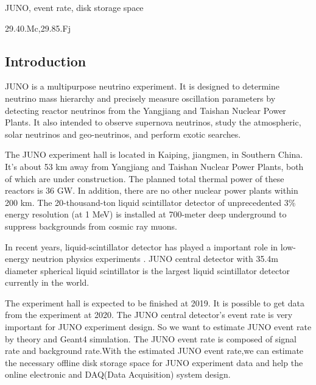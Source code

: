 \documentclass[a4paper,10pt,twoside]{paper}
\begin{document}
	\begin{keyword}
		JUNO, event rate, disk storage space
	\end{keyword}

	\begin{pacs}
		29.40.Mc,29.85.Fj
	\end{pacs}


	\begin{multicols}{2}

		\section{Introduction}
		JUNO\cite{lab1} is a multipurpose neutrino experiment. It is
		designed to determine neutrino mass hierarchy and precisely
		measure oscillation parameters by detecting reactor
		neutrinos from the Yangjiang and Taishan Nuclear Power
		Plants. It also intended to observe supernova neutrinos,
		study the atmospheric, solar neutrinos and geo-neutrinos,
		and perform exotic searches.

		The JUNO experiment hall is located in Kaiping, jiangmen,
		in Southern China. It's about 53 km away from Yangjiang
		and Taishan Nuclear Power Plants, both of which are
		under construction. The planned total thermal power of
		these reactors is 36 GW. In addition, there are no other
		nuclear power plants within 200 km.  The  20-thousand-ton
		liquid scintillator detector of unprecedented 3\% energy
		resolution (at 1 MeV) is installed at 700-meter deep
		underground to suppress backgrounds from cosmic ray muons. 

		In recent years, liquid-scintillator detector has played a important role in low-energy
		neutrion physics experiments \cite{lab2, lab3, lab4, lab5, lab6, lab7}.
		JUNO central detector with 35.4m diameter spherical liquid scintillator is the largest
		liquid scintillator detector currently in the world. 

		The experiment hall is expected to be finished at 2019. 
		It is possible to get data from the experiment at 2020.
		The JUNO central detector's event rate is very important for 
		JUNO experiment design. So we want to estimate JUNO
		event rate by theory and Geant4 simulation. The
		JUNO event rate is composed of signal rate and background
		rate.With the estimated JUNO event rate,we can estimate the necessary
		offline disk storage space for JUNO experiment data and help the 
		online electronic and DAQ(Data Acquisition) system design.
		

\end{multicols}
\end{document}
